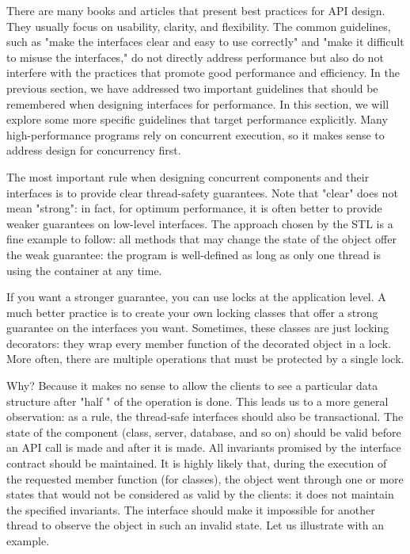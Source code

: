 
There are many books and articles that present best practices for API design. They usually focus on usability, clarity, and flexibility. The common guidelines, such as "make the interfaces clear and easy to use correctly" and "make it difficult to misuse the interfaces," do not directly address performance but also do not interfere with the practices that promote good performance and efficiency. In the previous section, we have addressed two important guidelines that should be remembered when designing interfaces for performance. In this section, we will explore some more specific guidelines that target performance explicitly. Many high-performance programs rely on concurrent execution, so it makes sense to address design for concurrency first.


The most important rule when designing concurrent components and their interfaces is to provide clear thread-safety guarantees. Note that "clear" does not mean "strong": in fact, for optimum performance, it is often better to provide weaker guarantees on low-level interfaces. The approach chosen by the STL is a fine example to follow: all methods that may change the state of the object offer the weak guarantee: the program is well-defined as long as only one thread is using the container at any time. 

If you want a stronger guarantee, you can use locks at the application level. A much better practice is to create your own locking classes that offer a strong guarantee on the interfaces you want. Sometimes, these classes are just locking decorators: they wrap every member function of the decorated object in a lock. More often, there are multiple operations that must be protected by a single lock.

Why? Because it makes no sense to allow the clients to see a particular data structure after "half " of the operation is done. This leads us to a more general observation: as a rule, the thread-safe interfaces should also be transactional. The state of the component (class, server, database, and so on) should be valid before an API call is made and after it is made. All invariants promised by the interface contract should be maintained. It is highly likely that, during the execution of the requested member function (for classes), the object went through one or more states that would not be considered as valid by the clients: it does not maintain the specified invariants. The interface should make it impossible for another thread to observe the object in such an invalid state. Let us illustrate with an example.


